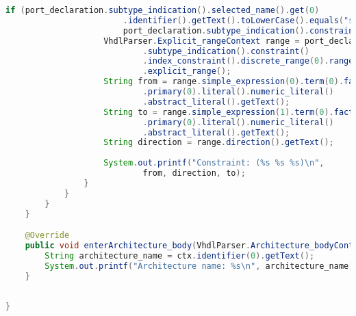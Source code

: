 \documentclass[main.tex]{subfiles}
\begin{document}
\begin{lstlisting}[language=Java, caption={Contents of \texttt{./src/main/java/nl/matthijsbos/fpgaedu/wrapper/MyListener.java}}]
                if (port_declaration.subtype_indication().selected_name().get(0)
                        .identifier().getText().toLowerCase().equals("std_logic_vector") &&
                        port_declaration.subtype_indication().constraint() != null) {
                    VhdlParser.Explicit_rangeContext range = port_declaration
                            .subtype_indication().constraint()
                            .index_constraint().discrete_range(0).range()
                            .explicit_range();
                    String from = range.simple_expression(0).term(0).factor(0)
                            .primary(0).literal().numeric_literal()
                            .abstract_literal().getText();
                    String to = range.simple_expression(1).term(0).factor(0)
                            .primary(0).literal().numeric_literal()
                            .abstract_literal().getText();
                    String direction = range.direction().getText();
                    
                    System.out.printf("Constraint: (%s %s %s)\n", 
                            from, direction, to);
                }
            }
        }
    }

    @Override
    public void enterArchitecture_body(VhdlParser.Architecture_bodyContext ctx) {
        String architecture_name = ctx.identifier(0).getText();
        System.out.printf("Architecture name: %s\n", architecture_name);
    }
    
    
}

\end{lstlisting}
\end{document}
